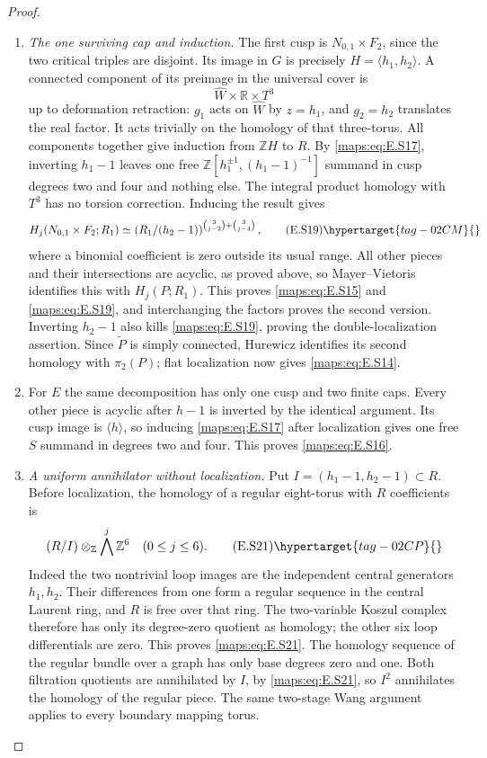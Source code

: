 \begin{proof}
\begin{enumerate}[label={$\langle1\rangle$\arabic*.},leftmargin=*]
\item \emph{The one surviving cap and induction.}
The first cusp is $N_{0,1}\times F_2$, since the two critical
triples are disjoint. Its image in $G$ is precisely
$H=\langle h_1,h_2\rangle$. A connected component of its
preimage in the universal cover is
\[
                \widehat W\times\mathbb R\times T^3
\]
up to deformation retraction: $g_1$ acts on $\widehat W$ by
$z=h_1$, and $g_2=h_2$ translates the real factor. It acts
trivially on the homology of that three-torus. All
components together give induction from $\mathbb ZH$ to
$R$. By \eqref{maps:eq:E.S17}, inverting $h_1-1$ leaves one free
$\mathbb Z[h_1^{\pm1},(h_1-1)^{-1}]$ summand in cusp degrees
two and four and nothing else. The integral product homology
with $T^3$ has no torsion correction. Inducing the result gives
\[
 H_j(N_{0,1}\times F_2;R_1)
   \simeq
 \left(R_1/(h_2-1)\right)^{
           \binom3{j-2}+\binom3{j-4}},
 \tag{E.S19}\hypertarget{tag-02CM}{}\label{maps:eq:E.S19}
\]
where a binomial coefficient is zero outside its usual range.
All other pieces and their intersections are acyclic, as
proved above, so Mayer--Vietoris identifies this with
$H_j(P;R_1)$. This proves \eqref{maps:eq:E.S15} and \eqref{maps:eq:E.S19}, and interchanging
the factors proves the second version. Inverting $h_2-1$
also kills \eqref{maps:eq:E.S19}, proving the double-localization assertion.
Since $\widetilde P$ is simply connected, Hurewicz identifies
its second homology with $\pi_2(P)$; flat localization now
gives \eqref{maps:eq:E.S14}.

\item For $E$ the same decomposition has only one cusp and two
finite caps. Every other piece is acyclic after $h-1$ is
inverted by the identical argument. Its cusp image is
$\langle h\rangle$, so inducing \eqref{maps:eq:E.S17} after localization
gives one free $S$ summand in degrees two and four. This
proves \eqref{maps:eq:E.S16}.

\item \emph{A uniform annihilator without localization.}
Put $I=(h_1-1,h_2-1)\subset R$. Before localization, the homology
of a regular eight-torus with $R$ coefficients is
\[
                 (R/I)\otimes_{\mathbb Z}\bigwedge^j\mathbb Z^6
                      \quad(0\leq j\leq6).
 \tag{E.S21}\hypertarget{tag-02CP}{}\label{maps:eq:E.S21}
\]
Indeed the two nontrivial loop images are the independent central
generators $h_1,h_2$. Their differences from one form a regular
sequence in the central Laurent ring, and $R$ is free over that
ring. The two-variable Koszul complex therefore has only its
degree-zero quotient as homology; the other six loop differentials
are zero. This proves \eqref{maps:eq:E.S21}.
The homology sequence of the regular bundle over a graph has
only base degrees zero and one. Both filtration quotients are
annihilated by $I$, by \eqref{maps:eq:E.S21}, so $I^2$ annihilates the homology
of the regular piece. The same two-stage Wang argument applies
to every boundary mapping torus. 


\end{enumerate}
\end{proof}
